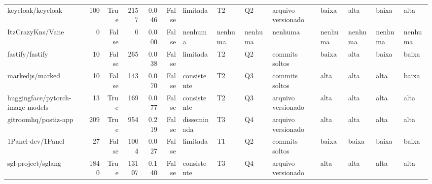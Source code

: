 \begin{tabular}{lrrrrrllllllll}
keycloak/keycloak & 100 & True & 2157 & 0.046 & False & limitada & T2 & Q2 & arquivo versionado & baixa & alta & baixa & alta \\
ItzCrazyKns/Vane & 0 & False & 0 & 0.000 & False & nenhuma & nenhuma & nenhuma & nenhuma & nenhuma & nenhuma & nenhuma & nenhuma \\
fastify/fastify & 10 & False & 265 & 0.038 & False & limitada & T2 & Q2 & commits soltos & baixa & alta & baixa & baixa \\
markedjs/marked & 10 & False & 143 & 0.070 & False & consistente & T2 & Q3 & commits soltos & alta & alta & alta & baixa \\
huggingface/pytorch-image-models & 13 & True & 169 & 0.077 & False & consistente & T2 & Q3 & arquivo versionado & alta & alta & alta & alta \\
gitroomhq/postiz-app & 209 & True & 954 & 0.219 & False & disseminada & T3 & Q4 & arquivo versionado & alta & alta & alta & alta \\
1Panel-dev/1Panel & 27 & False & 1004 & 0.027 & False & limitada & T1 & Q2 & commits soltos & baixa & baixa & baixa & baixa \\
sgl-project/sglang & 1840 & True & 13107 & 0.140 & False & consistente & T3 & Q4 & arquivo versionado & alta & alta & alta & alta \\
\bottomrule
\end{tabular}
